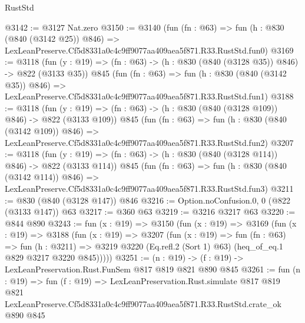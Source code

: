 \begin{lexlean}{RustStd}
\begin{coremodule}
@3142 := @3127 Nat.zero
@3150 := @3140
    (fun (fn : @63) =>
    fun (h : @830 (@840 (@3142 @25)) @846) =>
    LexLeanPreserve.Cf5d8331a0c4c9ff9077aa409aea5f871.R33.RustStd.fun0)
@3169 := @3118
    (fun (y : @19) => (fn : @63) -> (h : @830 (@840 (@3128 @35)) @846) -> @822 (@3133 @35))
    @845
    (fun (fn : @63) =>
    fun (h : @830 (@840 (@3142 @35)) @846) =>
    LexLeanPreserve.Cf5d8331a0c4c9ff9077aa409aea5f871.R33.RustStd.fun1)
@3188 := @3118
    (fun (y : @19) => (fn : @63) -> (h : @830 (@840 (@3128 @109)) @846) -> @822 (@3133 @109))
    @845
    (fun (fn : @63) =>
    fun (h : @830 (@840 (@3142 @109)) @846) =>
    LexLeanPreserve.Cf5d8331a0c4c9ff9077aa409aea5f871.R33.RustStd.fun2)
@3207 := @3118
    (fun (y : @19) => (fn : @63) -> (h : @830 (@840 (@3128 @114)) @846) -> @822 (@3133 @114))
    @845
    (fun (fn : @63) =>
    fun (h : @830 (@840 (@3142 @114)) @846) =>
    LexLeanPreserve.Cf5d8331a0c4c9ff9077aa409aea5f871.R33.RustStd.fun3)
@3211 := @830 (@840 (@3128 @147)) @846
@3216 := Option.noConfusion.{0, 0} (@822 (@3133 @147)) @63
@3217 := @360 @63
@3219 := @3216 @3217 @63
@3220 := @844 @890
@3243 := fun (x : @19) =>
  @3150
    (fun (x : @19) =>
    @3169
      (fun (x : @19) =>
      @3188
        (fun (x : @19) =>
        @3207
          (fun (x : @19) =>
          fun (fn : @63) =>
          fun (h : @3211) =>
          @3219 @3220 (Eq.refl.{2} (Sort 1) @63) (heq_of_eq.{1} @829 @3217 @3220 @845)))))
@3251 := (n : @19) -> (f : @19) -> LexLeanPreservation.Rust.FunSem @817 @819 @821 @890 @845
@3261 := fun (n : @19) =>
  fun (f : @19) =>
  LexLeanPreservation.Rust.simulate
    @817
    @819
    @821
    LexLeanPreserve.Cf5d8331a0c4c9ff9077aa409aea5f871.R33.RustStd.crate_ok
    @890
    @845
\end{coremodule}
\end{lexlean}
